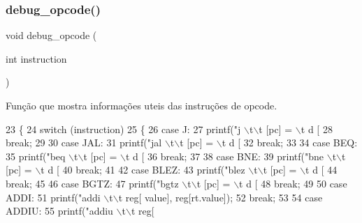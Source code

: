 \subsubsection{debug\+\_\+opcode()}
{\footnotesize\ttfamily void debug\+\_\+opcode (\begin{DoxyParamCaption}\item[{int}]{instruction }\end{DoxyParamCaption})}



Função que mostra informações uteis das instruções de opcode. 


\begin{DoxyCode}
23 \{
24     \textcolor{keywordflow}{switch} (instruction)
25     \{
26     \textcolor{keywordflow}{case} J:
27         printf(\textcolor{stringliteral}{"j \(\backslash\)t\(\backslash\)t [pc] = \(\backslash\)t d [%
28         \textcolor{keywordflow}{break};
29 
30     \textcolor{keywordflow}{case} JAL:
31         printf(\textcolor{stringliteral}{"jal \(\backslash\)t\(\backslash\)t [pc] = \(\backslash\)t d [%
32         \textcolor{keywordflow}{break};
33 
34     \textcolor{keywordflow}{case} BEQ:
35         printf(\textcolor{stringliteral}{"beq \(\backslash\)t\(\backslash\)t [pc] = \(\backslash\)t d [%
36         \textcolor{keywordflow}{break};
37 
38     \textcolor{keywordflow}{case} BNE:
39         printf(\textcolor{stringliteral}{"bne \(\backslash\)t\(\backslash\)t [pc] = \(\backslash\)t d [%
40         \textcolor{keywordflow}{break};
41 
42     \textcolor{keywordflow}{case} BLEZ:
43         printf(\textcolor{stringliteral}{"blez \(\backslash\)t\(\backslash\)t [pc] = \(\backslash\)t d [%
44         \textcolor{keywordflow}{break};
45 
46     \textcolor{keywordflow}{case} BGTZ:
47         printf(\textcolor{stringliteral}{"bgtz \(\backslash\)t\(\backslash\)t [pc] = \(\backslash\)t d [%
48         \textcolor{keywordflow}{break};
49 
50     \textcolor{keywordflow}{case} ADDI:
51         printf(\textcolor{stringliteral}{"addi \(\backslash\)t\(\backslash\)t reg[%
      value], reg[rt.value]);
52         \textcolor{keywordflow}{break};
53 
54     \textcolor{keywordflow}{case} ADDIU:
55         printf(\textcolor{stringliteral}{"addiu \(\backslash\)t\(\backslash\)t reg[%
}}}}}}}}
\end{DoxyCode}
